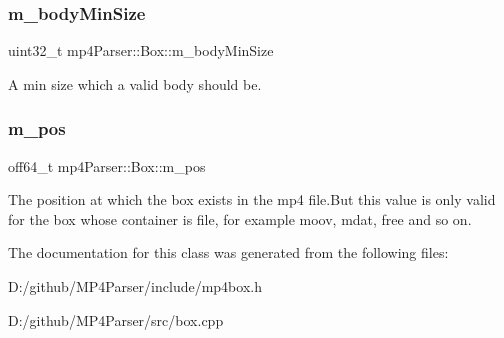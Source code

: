\subsubsection{\texorpdfstring{m\_bodyMinSize}{m\_bodyMinSize}}
{\footnotesize\ttfamily uint32\+\_\+t mp4\+Parser\+::\+Box\+::m\+\_\+body\+Min\+Size\hspace{0.3cm}{\ttfamily [protected]}}

A min size which a valid body should be. \mbox{\label{classmp4_parser_1_1_box_a795d4a890b967c920cb922c51606e3c3}} 
\subsubsection{\texorpdfstring{m\_pos}{m\_pos}}
{\footnotesize\ttfamily off64\+\_\+t mp4\+Parser\+::\+Box\+::m\+\_\+pos\hspace{0.3cm}{\ttfamily [protected]}}

The position at which the box exists in the mp4 file.\+But this value is only valid for the box whose container is file, for example moov, mdat, free and so on. 

The documentation for this class was generated from the following files\+:\begin{DoxyCompactItemize}
\item 
D\+:/github/\+M\+P4\+Parser/include/mp4box.\+h\item 
D\+:/github/\+M\+P4\+Parser/src/box.\+cpp\end{DoxyCompactItemize}
